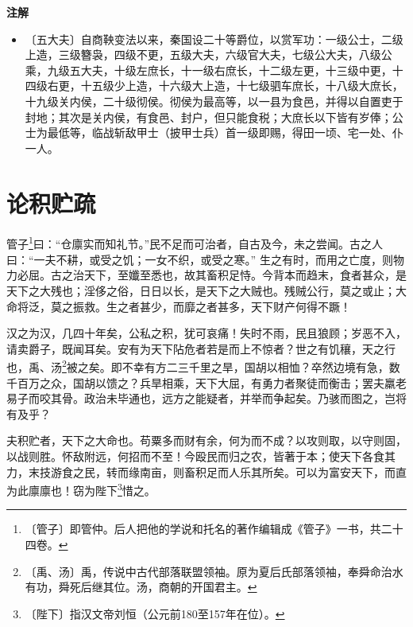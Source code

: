 \documentclass[12pt,UTF-8,openany,a4]{ctexbook}
\begin{document}
\newpage

\begin{Large}
    \noindent\textbf{注解}
\end{Large}


\vspace{-1em}

\begin{itemize}
    \setlength\itemsep{-0.2em}
    \item〔五大夫〕{\yiwen 自商鞅变法以来，秦国设二十等爵位，以赏军功：一级公士，二级上造，三级簪袅，四级不更，五级大夫，六级官大夫，七级公大夫，八级公乘，九级五大夫，十级左庶长，十一级右庶长，十二级左更，十三级中更，十四级右更，十五级少上造，十六级大上造，十七级驷车庶长，十八级大庶长，十九级关内侯，二十级彻侯。彻侯为最高等，以一县为食邑，并得以自置吏于封地；其次是关内侯，有食邑、封户，但只能食税；大庶长以下皆有岁俸；公士为最低等，临战斩敌甲士（披甲士兵）首一级即赐，得田一顷、宅一处、仆一人。}
\end{itemize}

\chapter{论积贮疏}

\begin{large}
    
    管子\footnote{〔管子〕\yiwen 即管仲。后人把他的学说和托名的著作编辑成《管子》一书，共二十四卷。}曰：“仓廪实而知礼节。”民不足而可治者，自古及今，未之尝闻。古之人曰：“一夫不耕，或受之饥；一女不织，或受之寒。” 生之有时，而用之亡度，则物力必屈。古之治天下，至孅至悉也，故其畜积足恃。今背本而趋末，食者甚众，是天下之大残也；淫侈之俗，日日以长，是天下之大贼也。残贼公行，莫之或止；大命将泛，莫之振救。生之者甚少，而靡之者甚多，天下财产何得不蹶！
    
    汉之为汉，几四十年矣，公私之积，犹可哀痛！失时不雨，民且狼顾；岁恶不入，请卖爵子，既闻耳矣。安有为天下阽危者若是而上不惊者？世之有饥穰，天之行也，禹、汤\footnote{〔禹、汤〕\yiwen 禹，传说中古代部落联盟领袖。原为夏后氏部落领袖，奉舜命治水有功，舜死后继其位。汤，商朝的开国君主。}被之矣。即不幸有方二三千里之旱，国胡以相恤？卒然边境有急，数千百万之众，国胡以馈之？兵旱相乘，天下大屈，有勇力者聚徒而衡击；罢夫羸老易子而咬其骨。政治未毕通也，远方之能疑者，并举而争起矣。乃骇而图之，岂将有及乎？
    
    夫积贮者，天下之大命也。苟粟多而财有余，何为而不成？以攻则取，以守则固，以战则胜。怀敌附远，何招而不至！今殴民而归之农，皆著于本；使天下各食其力，末技游食之民，转而缘南亩，则畜积足而人乐其所矣。可以为富安天下，而直为此廪廪也！窃为陛下\footnote{〔陛下〕\yiwen 指汉文帝刘恒（公元前180至157年在位）。}惜之。
\end{large}
\end{document}
